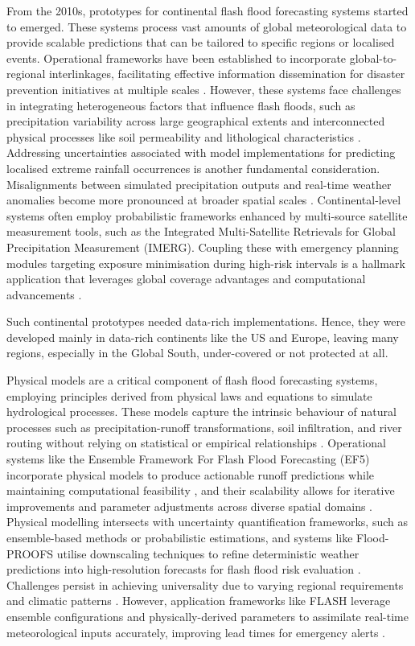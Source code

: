 From the 2010s, prototypes for continental flash flood forecasting systems started to emerged. These systems process vast amounts of global meteorological data to provide scalable predictions that can be tailored to specific regions or localised events. Operational frameworks have been established to incorporate global-to-regional interlinkages, facilitating effective information dissemination for disaster prevention initiatives at multiple scales \citep{Georgakakos2022}. However, these systems face challenges in integrating heterogeneous factors that influence flash floods, such as precipitation variability across large geographical extents and interconnected physical processes like soil permeability and lithological characteristics \citep{Henao2022, Henao2022a, Kuksina2020}. Addressing uncertainties associated with model implementations for predicting localised extreme rainfall occurrences is another fundamental consideration. Misalignments between simulated precipitation outputs and real-time weather anomalies become more pronounced at broader spatial scales \citep{Maqtan2022a, Maqtan2022b}. Continental-level systems often employ probabilistic frameworks enhanced by multi-source satellite measurement tools, such as the Integrated Multi-Satellite Retrievals for Global Precipitation Measurement (IMERG). Coupling these with emergency planning modules targeting exposure minimisation during high-risk intervals is a hallmark application that leverages global coverage advantages and computational advancements \citep{AlRawas2024}.

Such continental prototypes needed data-rich implementations. Hence, they were developed mainly in data-rich continents like the US and Europe, leaving many regions, especially in the Global South, under-covered or not protected at all. 

Physical models are a critical component of flash flood forecasting systems, employing principles derived from physical laws and equations to simulate hydrological processes. These models capture the intrinsic behaviour of natural processes such as precipitation-runoff transformations, soil infiltration, and river routing without relying on statistical or empirical relationships \citep{Hinge2024}. Operational systems like the Ensemble Framework For Flash Flood Forecasting (EF5) incorporate physical models to produce actionable runoff predictions while maintaining computational feasibility \citep{Flamig2020}, and their scalability allows for iterative improvements and parameter adjustments across diverse spatial domains \citep{Xing2019a}. Physical modelling intersects with uncertainty quantification frameworks, such as ensemble-based methods or probabilistic estimations, and systems like Flood-PROOFS utilise downscaling techniques to refine deterministic weather predictions into high-resolution forecasts for flash flood risk evaluation \citep{Zanchetta2020}. Challenges persist in achieving universality due to varying regional requirements and climatic patterns \citep{Xing2019a, AlRawas2024}. However, application frameworks like FLASH leverage ensemble configurations and physically-derived parameters to assimilate real-time meteorological inputs accurately, improving lead times for emergency alerts \citep{Martinaitis2023}. 


